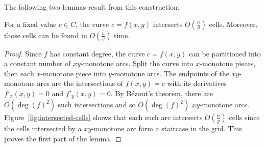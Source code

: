The following two lemmas result from this construction:
\begin{lemma}\label{lem:intersections}
    For a fixed value \(c \in C\), the curve $c=f(x,y)$ intersects $O(\frac ng)$
    cells. Moreover, those cells can be found in $O(\frac ng)$ time.
\end{lemma}
\begin{proof}
    Since $f$ has constant degree, the curve $c=f(x,y)$ can be partitioned into
    a constant number of $xy$-monotone arcs. Split the curve into
    $x$-monotone pieces, then each $x$-monotone piece into $y$-monotone arcs.
    The endpoints of the $xy$-monotone arcs are the intersections of
    $f(x,y)=c$ with its derivatives $f'_x(x,y)=0$ and $f'_y(x,y)=0$. By
    B\'ezout's theorem, there are $O({\deg(f)}^2)$ such intersections and so
    $O({\deg(f)}^2)$ $xy$-monotone arcs. Figure~\ref{fig:intersected-cells} shows
    that each such arc intersects $O(\frac ng)$ cells since the
    cells intersected by a $xy$-monotone arc form a staircase in the
    grid.
    This proves the first part of the lemma.


\end{proof}
